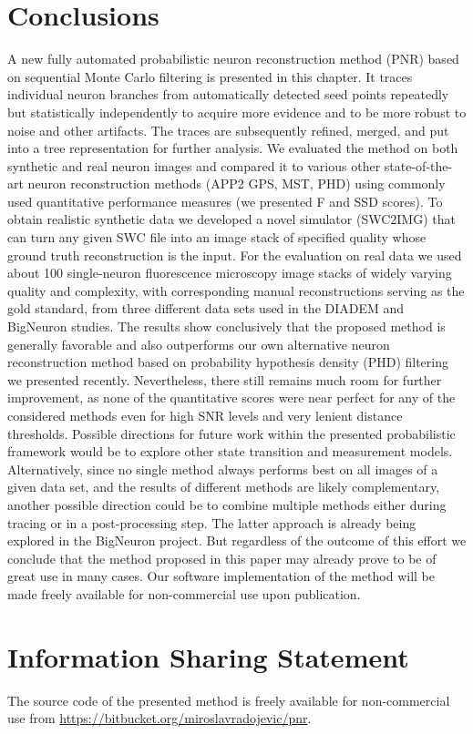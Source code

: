 \section{Conclusions} 
\label{sec:conclusions}
A new fully automated probabilistic neuron reconstruction method (PNR) based on sequential Monte Carlo filtering is presented in this chapter. It traces individual neuron branches from automatically detected seed points repeatedly but statistically independently to acquire more evidence and to be more robust to noise and other artifacts. The traces are subsequently refined, merged, and put into a tree representation for further analysis. We evaluated the method on both synthetic and real neuron images and compared it to various other state-of-the-art neuron reconstruction methods (APP2 GPS, MST, PHD) using commonly used quantitative performance measures (we presented F and SSD scores). To obtain realistic synthetic data we developed a novel simulator (SWC2IMG) that can turn any given SWC file into an image stack of specified quality whose ground truth reconstruction is the input. For the evaluation on real data we used about 100 single-neuron fluorescence microscopy image stacks of widely varying quality and complexity, with corresponding manual reconstructions serving as the gold standard, from three different data sets used in the DIADEM and BigNeuron studies. The results show conclusively that the proposed method is generally favorable and also outperforms our own alternative neuron reconstruction method based on probability hypothesis density (PHD) filtering we presented recently. Nevertheless, there still remains much room for further improvement, as none of the quantitative scores were near perfect for any of the considered methods even for high SNR levels and very lenient distance thresholds. Possible directions for future work within the presented probabilistic framework would be to explore other state transition and measurement models. Alternatively, since no single method always performs best on all images of a given data set, and the results of different methods are likely complementary, another possible direction could be to combine multiple methods either during tracing or in a post-processing step. The latter approach is already being explored in the BigNeuron project. But regardless of the outcome of this effort we conclude that the method proposed in this paper may already prove to be of great use in many cases. Our software implementation of the method will be made freely available for non-commercial use upon publication.

\section{Information Sharing Statement}
The source code of the presented method is freely available for non-commercial use from \url{https://bitbucket.org/miroslavradojevic/pnr}.

